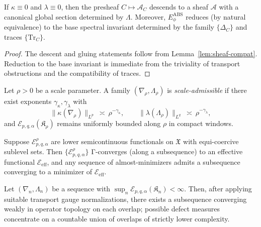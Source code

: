 \begin{theorem}\label{thm:loc2glob}
If $\kappa\equiv 0$ and $\lambda\equiv 0$, then the presheaf $C\mapsto \mathcal A_C$ descends to a sheaf $\mathscr A$ with a canonical global section determined by $\Lambda$. Moreover, $E_{\phi}^{\mathrm{ABS}}$ reduces (by natural equivalence) to the base spectral invariant determined by the family $\{\Delta_C\}$ and traces $\{\mathrm{Tr}_C\}$.
\end{theorem}

\begin{proof}
The descent and gluing statements follow from Lemma~\ref{lem:sheaf-compat}. Reduction to the base invariant is immediate from the triviality of transport obstructions and the compatibility of traces. \relax
\end{proof}


\begin{definition}\label{def:scaling}
Let $\rho>0$ be a scale parameter. A family $(\nabla_\rho,\Lambda_\rho)$ is \emph{scale-admissible} if there exist exponents $\gamma_\kappa,\gamma_\lambda$ with
\[
\|\kappa(\nabla_\rho)\|_{L^p}\ \asymp\ \rho^{-\gamma_\kappa},\qquad
\|\lambda(\Lambda_\rho)\|_{L^q}\ \asymp\ \rho^{-\gamma_\lambda},
\]
and $\mathcal E_{p,q,\alpha}(\mathfrak K_\rho)$ remains uniformly bounded along $\rho$ in compact windows.
\end{definition}

\begin{theorem}\label{thm:Gamma}
Suppose $\mathcal E_{p,q,\alpha}^\rho$ are lower semicontinuous functionals on $\mathfrak X$ with equi-coercive sublevel sets. Then $\{\mathcal E_{p,q,\alpha}^\rho\}$ Γ-converges (along a subsequence) to an effective functional $\mathcal E_{\mathrm{eff}}$, and any sequence of almost-minimizers admits a subsequence converging to a minimizer of $\mathcal E_{\mathrm{eff}}$.
\end{theorem}

\begin{theorem}\label{thm:compactness}
Let $(\nabla_n,\Lambda_n)$ be a sequence with $\sup_n \mathcal E_{p,q,\alpha}(\mathfrak K_n)<\infty$. Then, after applying suitable transport gauge normalizations, there exists a subsequence converging weakly in operator topology on each overlap; possible defect measures concentrate on a countable union of overlaps of strictly lower complexity.
\end{theorem}

